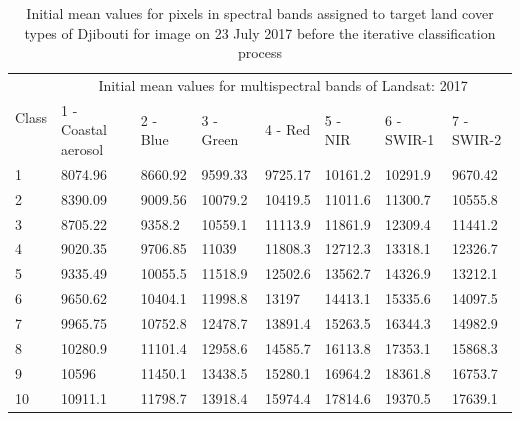 \documentclass[jimaging,article,submit,pdftex,moreauthors]{Definitions/mdpi}
\begin{document}
\begin{table}[H]
  \centering
  \begin{tabularx}{\textwidth}{p{0.7cm}p{2.5cm}p{1.0cm}p{1.3cm}p{1.0cm}p{1.0cm}p{1.5cm}p{1.5cm}}
  \toprule
  \multirow{2}{*}{Class} & \multicolumn{7}{c}{Initial mean values for multispectral bands of Landsat:  2017} \\
     & 1 - Coastal aerosol & 2 - Blue & 3 - Green & 4 - Red & 5 - NIR & 6 - SWIR-1 & 7 - SWIR-2 \\
    \midrule
    1 & 8074.96 & 8660.92 & 9599.33 & 9725.17 & 10161.2 & 10291.9 & 9670.42 \\
    2 & 8390.09 & 9009.56 & 10079.2 & 10419.5 & 11011.6 & 11300.7 & 10555.8 \\
    3 & 8705.22 & 9358.2 & 10559.1 & 11113.9 & 11861.9 & 12309.4 & 11441.2 \\
    4 & 9020.35 & 9706.85 & 11039 & 11808.3 & 12712.3 & 13318.1 & 12326.7 \\
    5 & 9335.49 & 10055.5 & 11518.9 & 12502.6 & 13562.7 & 14326.9 & 13212.1 \\
    6 & 9650.62 & 10404.1 & 11998.8 & 13197 & 14413.1 & 15335.6 & 14097.5 \\
    7 & 9965.75 &10752.8 & 12478.7 &13891.4 & 15263.5 & 16344.3 & 14982.9 \\
    8 & 10280.9 & 11101.4 & 12958.6 & 14585.7 & 16113.8 & 17353.1 & 15868.3 \\
    9 & 10596 &11450.1 & 13438.5 & 15280.1 & 16964.2 & 18361.8 & 16753.7 \\
    10 & 10911.1 & 11798.7 & 13918.4 & 15974.4 & 17814.6 & 19370.5 & 17639.1 \\
\bottomrule
\end{tabularx}
  \caption{Initial mean values for pixels in spectral bands assigned to target land cover types of Djibouti for image on 23 July 2017 before the iterative classification process}
  \label{tabA2} 
\end{table} 
\end{document}
